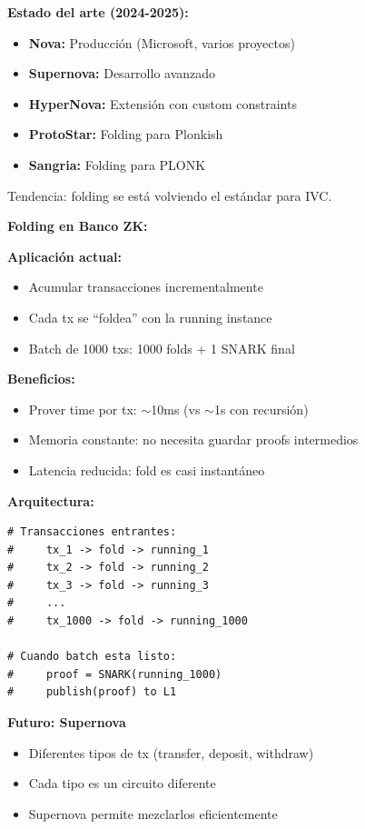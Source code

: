 \documentclass[11pt,a4paper,twoside]{book}
\begin{document}
\begin{remark}
\textbf{Estado del arte (2024-2025):}

\begin{itemize}
    \item \textbf{Nova:} Producci\'on (Microsoft, varios proyectos)
    \item \textbf{Supernova:} Desarrollo avanzado
    \item \textbf{HyperNova:} Extensi\'on con custom constraints
    \item \textbf{ProtoStar:} Folding para Plonkish
    \item \textbf{Sangria:} Folding para PLONK
\end{itemize}

Tendencia: folding se est\'a volviendo el est\'andar para IVC.
\end{remark}

\begin{bancozk}
\textbf{Folding en Banco ZK:}

\textbf{Aplicaci\'on actual:}
\begin{itemize}
    \item Acumular transacciones incrementalmente
    \item Cada tx se ``foldea'' con la running instance
    \item Batch de 1000 txs: 1000 folds + 1 SNARK final
\end{itemize}

\textbf{Beneficios:}
\begin{itemize}
    \item Prover time por tx: $\sim$10ms (vs $\sim$1s con recursi\'on)
    \item Memoria constante: no necesita guardar proofs intermedios
    \item Latencia reducida: fold es casi instant\'aneo
\end{itemize}

\textbf{Arquitectura:}
\begin{lstlisting}[style=python]
# Transacciones entrantes:
#     tx_1 -> fold -> running_1
#     tx_2 -> fold -> running_2
#     tx_3 -> fold -> running_3
#     ...
#     tx_1000 -> fold -> running_1000

# Cuando batch esta listo:
#     proof = SNARK(running_1000)
#     publish(proof) to L1
\end{lstlisting}

\textbf{Futuro: Supernova}
\begin{itemize}
    \item Diferentes tipos de tx (transfer, deposit, withdraw)
    \item Cada tipo es un circuito diferente
    \item Supernova permite mezclarlos eficientemente
\end{itemize}
\end{bancozk}
\end{document}
